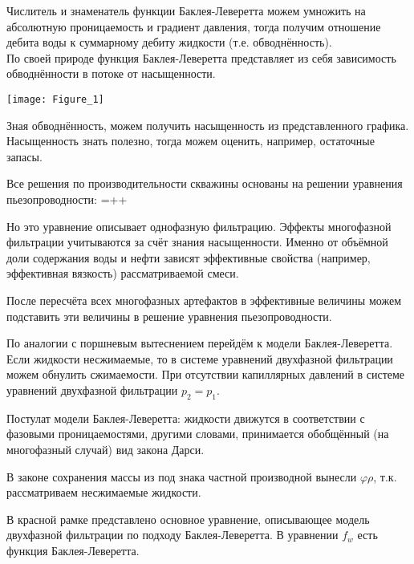 \documentclass[main.tex]{subfiles}
\begin{document}
Числитель и знаменатель функции Баклея-Леверетта можем умножить на абсолютную проницаемость и градиент давления, тогда получим отношение дебита воды к суммарному дебиту жидкости (т.е. обводнённость).\\

По своей природе функция Баклея-Леверетта представляет из себя зависимость обводнённости в потоке от насыщенности.


\begin{center}
\texttt{[image: Figure\_1]}
\end{center}

Зная обводнённость, можем получить насыщенность из представленного графика. Насыщенность знать полезно, тогда можем оценить, например, остаточные запасы.

Все решения по производительности скважины основаны на решении уравнения пьезопроводности:
\beq
{}=++
\eeq

Но это уравнение описывает однофазную фильтрацию. Эффекты многофазной фильтрации учитываются за счёт знания насыщенности. Именно от объёмной доли содержания воды и нефти зависят эффективные свойства (например, эффективная вязкость) рассматриваемой смеси.

После пересчёта всех многофазных артефактов в эффективные величины можем подставить эти величины в решение уравнения пьезопроводности.



По аналогии с поршневым вытеснением перейдём к модели Баклея-Леверетта. Если жидкости несжимаемые, то в системе уравнений двухфазной фильтрации можем обнулить сжимаемости. При отсутствии капиллярных давлений в системе уравнений двухфазной фильтрации $p_2=p_1$.

Постулат модели Баклея-Леверетта: жидкости движутся в соответствии с фазовыми проницаемостями, другими словами, принимается обобщённый (на многофазный случай) вид закона Дарси.

В законе сохранения массы из под знака частной производной вынесли $\varphi\rho$, т.к. рассматриваем несжимаемые жидкости.

В красной рамке представлено основное уравнение, описывающее модель двухфазной фильтрации по подходу Баклея-Леверетта. В уравнении $f_w$ есть функция Баклея-Леверетта.
\end{document}
